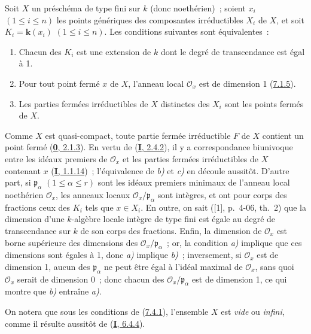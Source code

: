 \begin{proposition}[7.4.1]
\label{II.7.4.1-fr}
Soit $X$ un préschéma de type fini sur $k$ (donc noethérien)~; soient $x_i$
$(1\leq i\leq n)$ les points génériques des composantes irréductibles $X_i$ de
$X$, et soit $K_i=\boldsymbol{k}(x_i)$ $(1\leq i\leq n)$. Les conditions suivantes sont
équivalentes~:
\begin{enumerate}
\item[\rm a)] Chacun des $K_i$ est une extension de $k$ dont le degré de
transcendance est égal à 1.
\item[\rm b)] Pour tout point fermé $x$ de $X$, l'anneau local
$\mathcal{O}_x$ est de dimension 1 \textup{(\hyperref[II.7.1.5-fr]{7.1.5})}.
\item[\rm c)] Les parties fermées irréductibles de $X$ distinctes des $X_i$
sont les points fermés de $X$.
\end{enumerate}
\end{proposition}

Comme $X$ est quasi-compact, toute partie fermée irréductible $F$ de $X$
contient un point fermé (\hyperref[0.2.1.3-fr]{\textbf{0}, 2.1.3}). En vertu de
(\hyperref[I.2.4.2-fr]{\textbf{I}, 2.4.2}), il y a correspondance biunivoque entre les
idéaux premiers de $\mathcal{O}_x$ et les parties fermées irréductibles de $X$
contenant $x$ (\hyperref[I.1.1.14-fr]{\textbf{I}, 1.1.14})~; l'équivalence de \emph{b)} et \emph{c)}
en découle aussitôt. D'autre part, si $\mathfrak{p}_\alpha$
$(1\leq\alpha\leq r)$ sont les idéaux premiers minimaux de l'anneau local
noethérien $\mathcal{O}_x$, les anneaux locaux
$\mathcal{O}_x/\mathfrak{p}_\alpha$ sont intègres, et ont pour corps des
fractions ceux des $K_i$ tels que $x\in X_i$. En outre, on sait ([1],
p.~4-06, th.~2) que la dimension d'une $k$-algèbre locale intègre de type fini
est égale au degré de transcendance sur $k$ de son corps des fractions. Enfin,
la dimension de $\mathcal{O}_x$ est borne supérieure des dimensions des
$\mathcal{O}_x/\mathfrak{p}_\alpha$~; or, la condition \emph{a)} implique que ces
dimensions sont égales à 1, donc \emph{a)} implique \emph{b)}~; inversement, si
$\mathcal{O}_x$ est de dimension 1, aucun des $\mathfrak{p}_\alpha$ ne peut
être égal à l'idéal maximal de $\mathcal{O}_x$, sans quoi $\mathcal{O}_x$
serait de dimension 0~; donc chacun des
$\mathcal{O}_x/\mathfrak{p}_\alpha$ est de dimension 1, ce qui montre que \emph{b)}
entraîne \emph{a)}.

On notera que sous les conditions de (\hyperref[II.7.4.1-fr]{7.4.1}),
l'ensemble $X$ est \emph{vide} ou \emph{infini}, comme il résulte aussitôt de
(\hyperref[I.6.4.4-fr]{\textbf{I}, 6.4.4}).

